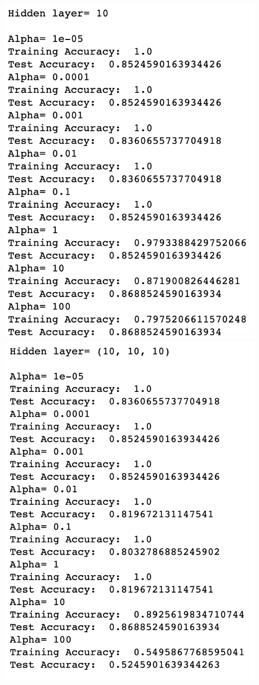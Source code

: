 \documentclass[11pt, oneside]{article}
\begin{document}
\includegraphics{8}\\
\includegraphics{9}\\
\end{document}
